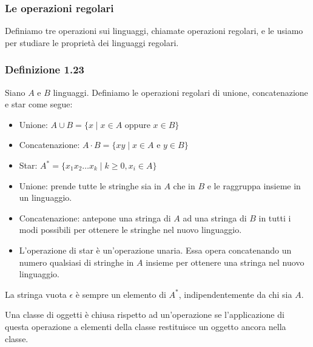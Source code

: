 \documentclass{article}
\begin{document}
\subsubsection{Le operazioni regolari}

Definiamo tre operazioni sui linguaggi, chiamate operazioni regolari, e le usiamo per studiare le proprietà dei linguaggi regolari.

\begin{tcolorbox}[colback=yellow!10!white, colframe=yellow!50!black, title=Operazioni Regolari]
\subsubsection{Definizione 1.23}
Siano $A$ e $B$ linguaggi. Definiamo le operazioni regolari di unione, concatenazione e star come segue:
\begin{itemize}
    \item Unione: $A \cup B = \{x \mid x \in A \text{ oppure } x \in B\}$
    \item Concatenazione: $A \cdot B = \{xy \mid x \in A \text{ e } y \in B\}$
    \item Star: $A^* = \{x_1 x_2 \dots x_k \mid k \geq 0, x_i \in A\}$
\end{itemize}

\begin{itemize}
    \item Unione: prende tutte le stringhe sia in $A$ che in $B$ e le raggruppa insieme in un linguaggio.
    \item Concatenazione: antepone una stringa di $A$ ad una stringa di $B$ in tutti i modi possibili per ottenere le stringhe nel nuovo linguaggio.
    \item L'operazione di star è un'operazione unaria. Essa opera concatenando un numero qualsiasi di stringhe in $A$ insieme per ottenere una stringa nel nuovo linguaggio.
\end{itemize}
\end{tcolorbox}

\begin{tcolorbox}[colback=red!10!white, colframe=red!50!black, title=Importante]
La stringa vuota $\epsilon$ è sempre un elemento di $A^*$, indipendentemente da chi sia $A$.
\end{tcolorbox}

Una classe di oggetti è chiusa rispetto ad un'operazione se l'applicazione di questa operazione a elementi della classe restituisce un oggetto ancora nella classe.
\end{document}
